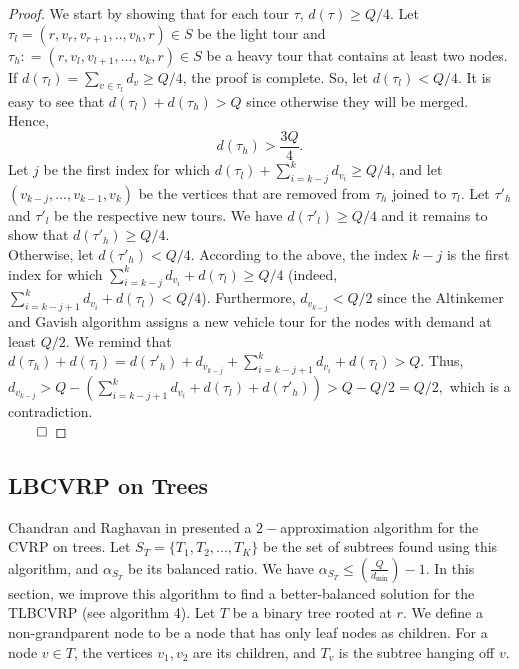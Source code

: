 \begin{proof}
\noindent We start by showing that for each tour $\tau$, $d(\tau ) \ge Q/4$. Let  $\tau_l = (r,{v_r},{v_{r + 1}},..,{v_h},r) \in S$ be the light tour and $\tau_h : = (r,{v_l},{v_{l + 1}},...,{v_k},r) \in S$ be a heavy tour that contains at least two nodes. If $d(\tau_l) = \sum\nolimits_{v \in \tau_l} {{d_v}}  \ge Q/4$, the proof is complete. So, let $d(\tau_l) < Q/4$. It is easy to see that $d(\tau_l) + d(\tau_h) > Q$ since otherwise they will be merged. Hence,
$$d(\tau_h) > \frac{3Q}{4}.$$
\noindent Let $j$ be the first index for which $d(\tau_l) + \sum\nolimits_{i= k - j}^k d_{v_i}\ge Q/4$, and let $({v_{k - j}},...,{v_{k - 1}},{v_k})$  be the vertices that are removed from $\tau_h$ joined to $\tau_l$. Let $\tau'_h$ and $\tau'_l$ be the respective new tours. We have $d(\tau'_l) \ge Q/4$ and it remains to show that $d(\tau '_h) \ge Q/4$. \\
\noindent Otherwise, let $d(\tau'_h) < Q/4$. According to the above, the index $k-j$ is the first index for which $\sum\limits_{i = k - j}^k {d_{v_i}}+ d(\tau_l) \ge Q/4$ (indeed,  $\sum\limits_{i = k - j + 1}^k d_{v_i}+ d(\tau_l) < Q/4$). Furthermore, $d_{v_{k - j}}< Q/2$ since the Altinkemer and Gavish algorithm assigns a new vehicle tour for the nodes with demand at least $Q/2$. We remind that  $d(\tau_h) + d(\tau_l) = d(\tau '_h) + d_{v_{k - j}} + \sum\limits_{i = k - j + 1}^k d_{v_i}  + d(\tau_l) > Q$. Thus,
$d_{v_{k - j}} > Q - (\sum\limits_{i = k - j + 1}^k {{d_{{v_i}}}}  + d(\tau_l) + d(\tau '_h)) > Q - Q/2= Q/2,$
which is a contradiction.\\
$\qed$
\end{proof}
\subsection{LBCVRP on Trees}
\noindent  Chandran and Raghavan in \cite{Chandran} presented a $2-$approximation algorithm for the CVRP on trees. Let $S_T=\{T_1, T_2,...,T_K\}$ be the set of subtrees found using this algorithm, and $\alpha_{S_T}$ be its balanced ratio. We have $\alpha_{S_T} \le (\frac{Q}{d_{\min }})-1$. In this section, we improve this algorithm to find a better-balanced solution for the TLBCVRP (see algorithm 4). Let $T$ be a binary tree rooted at $r$. We define a non-grandparent node to be a node that has only leaf nodes as children. For a node $v \in T$, the vertices $v_1, v_2$ are its children, and $T_v$ is the subtree hanging off $v$.

